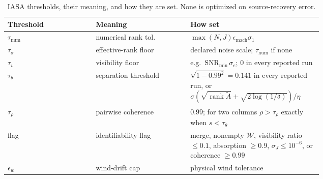 \begin{table}[t]
\centering
\small
\setlength{\tabcolsep}{3pt}
\caption{IASA thresholds, their meaning, and how they are set.  None is
optimized on source-recovery error.}
\label{tab:thresholds}
\begin{tabular}{lp{0.3\linewidth}p{0.42\linewidth}}
\toprule
Threshold & Meaning & How set \\
\midrule
\(\tau_{\mathrm{num}}\) & numerical rank tol.\ & \(\max(N,J)\epsilon_{\mathrm{mach}}\sigma_1\) \\
\(\tau_\sigma\) & effective-rank floor & declared noise scale; \(\tau_{\mathrm{num}}\) if none \\
\(\tau_v\) & visibility floor & e.g.\ \(\mathrm{SNR}_{\min}\,\sigma_e\); \(0\) in every reported run \\
\(\tau_\theta\) & separation threshold & \(\sqrt{1-0.99^2}=0.141\) in every reported run, or \(\sigma(\sqrt{\operatorname{rank}\widetilde A}+\sqrt{2\log(1/\delta)})/\eta\) \\
\(\tau_\rho\) & pairwise coherence & \(0.99\); for two columns \(\rho>\tau_\rho\) exactly when \(s<\tau_\theta\) \\
flag & identifiability flag & merge, nonempty \(\mathcal W\), visibility ratio \(\le0.1\), absorption \(\ge0.9\), \(\sigma_J\le10^{-6}\), or coherence \(\ge0.99\) \\
\(\epsilon_w\) & wind-drift cap & physical wind tolerance \\
\bottomrule
\end{tabular}
\end{table}

